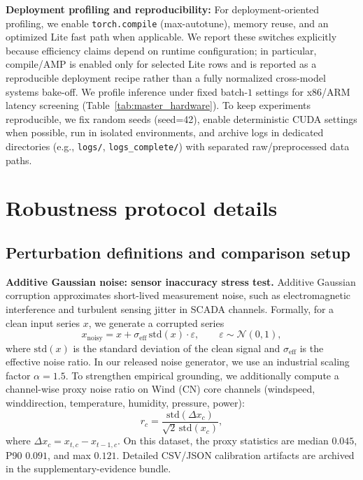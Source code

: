 \documentclass[review,1p,times]{elsarticle}
\begin{document}
\noindent\textbf{Deployment profiling and reproducibility:} For deployment-oriented profiling, we enable \texttt{torch.compile} (max-autotune), memory reuse, and an optimized Lite fast path when applicable. We report these switches explicitly because efficiency claims depend on runtime configuration; in particular, compile/AMP is enabled only for selected Lite rows and is reported as a reproducible deployment recipe rather than a fully normalized cross-model systems bake-off. We profile inference under fixed batch-$1$ settings for x86/ARM latency screening (Table~\ref{tab:master_hardware}). To keep experiments reproducible, we fix random seeds (seed=42), enable deterministic CUDA settings when possible, run in isolated environments, and archive logs in dedicated directories (e.g., \texttt{logs/}, \texttt{logs\_complete/}) with separated raw/preprocessed data paths.

\section{Robustness protocol details}\label{app:robust_details}
\subsection{Perturbation definitions and comparison setup}
\noindent\textbf{Additive Gaussian noise: sensor inaccuracy stress test.}
Additive Gaussian corruption approximates short-lived measurement noise, such as electromagnetic interference and turbulent sensing jitter in SCADA channels.
Formally, for a clean input series $x$, we generate a corrupted series
\begin{equation}
x_{\text{noisy}} = x + \sigma_{\mathrm{eff}}\,\mathrm{std}(x)\cdot \varepsilon, \qquad \varepsilon \sim \mathcal{N}(0,1),
\end{equation}
where $\mathrm{std}(x)$ is the standard deviation of the clean signal and $\sigma_{\mathrm{eff}}$ is the effective noise ratio.
In our released noise generator, we use an industrial scaling factor $\alpha=1.5$. To strengthen empirical grounding, we additionally compute a channel-wise proxy noise ratio on Wind (CN) core channels (windspeed, winddirection, temperature, humidity, pressure, power):
\begin{equation}
r_c=\frac{\mathrm{std}(\Delta x_c)}{\sqrt{2}\,\mathrm{std}(x_c)},
\end{equation}
where $\Delta x_c=x_{t,c}-x_{t-1,c}$. On this dataset, the proxy statistics are median $0.045$, P90 $0.091$, and max $0.121$. Detailed CSV/JSON calibration artifacts are archived in the supplementary-evidence bundle.
\end{document}
